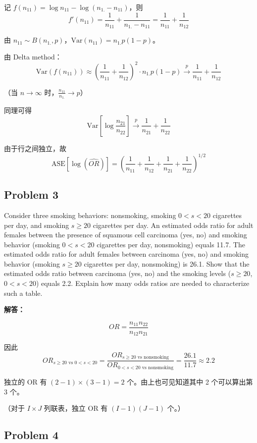 记 $f(n_{11}) = \log n_{11} - \log(n_{1.} - n_{11})$，则
\[
f'(n_{11}) = \frac{1}{n_{11}} + \frac{1}{n_{1.} - n_{11}} = \frac{1}{n_{11}} + \frac{1}{n_{12}}
\]

由 $n_{11} \sim B(n_{1.}, p)$，$\text{Var}(n_{11}) = n_{1.} p(1-p)$。

由 Delta method：
\[
\text{Var}(f(n_{11})) \approx \left(\frac{1}{n_{11}} + \frac{1}{n_{12}}\right)^2 \cdot n_{1.} p(1-p) \xrightarrow{p} \frac{1}{n_{11}} + \frac{1}{n_{12}}
\]

（当 $n \to \infty$ 时，$\frac{n_{11}}{n_{1.}} \to p$）

同理可得
\[
\text{Var}\left[\log\frac{n_{21}}{n_{22}}\right] \xrightarrow{p} \frac{1}{n_{21}} + \frac{1}{n_{22}}
\]

由于行之间独立，故
\[
\boxed{\text{ASE}\left[\log(\widehat{OR})\right] = \left(\frac{1}{n_{11}} + \frac{1}{n_{12}} + \frac{1}{n_{21}} + \frac{1}{n_{22}}\right)^{1/2}}
\]

\subsection{Problem 3}

Consider three smoking behaviors: nonsmoking, smoking $0 < s < 20$ cigarettes per day, and smoking $s \geq 20$ cigarettes per day. An estimated odds ratio for adult females between the presence of squamous cell carcinoma (yes, no) and smoking behavior (smoking $0 < s < 20$ cigarettes per day, nonsmoking) equals 11.7. The estimated odds ratio for adult females between carcinoma (yes, no) and smoking behavior (smoking $s \geq 20$ cigarettes per day, nonsmoking) is 26.1. Show that the estimated odds ratio between carcinoma (yes, no) and the smoking levels ($s \geq 20$, $0 < s < 20$) equals 2.2. Explain how many odds ratios are needed to characterize such a table.

\textbf{解答：}

\[
OR = \frac{n_{11} n_{22}}{n_{12} n_{21}}
\]

因此
\[
OR_{s \geq 20 \text{ vs } 0 < s < 20} = \frac{OR_{s \geq 20 \text{ vs nonsmoking}}}{OR_{0 < s < 20 \text{ vs nonsmoking}}} = \frac{26.1}{11.7} \approx 2.2
\]

独立的 OR 有 $(2-1) \times (3-1) = \boxed{2}$ 个。由上也可见知道其中 2 个可以算出第 3 个。

（对于 $I \times J$ 列联表，独立 OR 有 $(I-1)(J-1)$ 个。）

\subsection{Problem 4}

